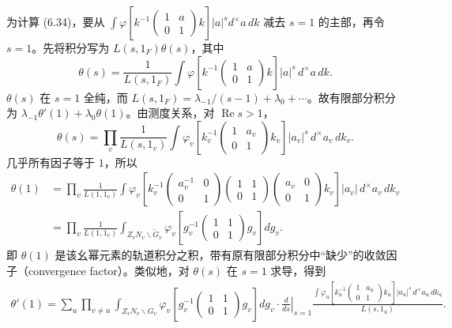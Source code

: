 为计算 (6.34)，要从
$\int\varphi[k^{-1}\left(\begin{smallmatrix}1&a\\0&1\end{smallmatrix}\right)k]|a|^s d^\times a\,dk$
减去 $s=1$ 的主部，再令 $s=1$。先将积分写为 $L(s,1_F)\theta(s)$，其中
\begin{equation}
 \theta(s)=\frac1{L(s,1_F)}\int
 \varphi\!\left[k^{-1}\begin{pmatrix}1&a\\0&1\end{pmatrix}k\right]|a|^s\,d^\times a\,dk.\tag{7.10}
\end{equation}
$\theta(s)$ 在 $s=1$ 全纯，而
$L(s,1_F)=\lambda_{-1}/(s-1)+\lambda_0+\cdots$。故有限部分积分为
$\lambda_{-1}\theta'(1)+\lambda_0\theta(1)$。由测度关系，对 $\operatorname{Re}s>1$，
\[
 \theta(s)=\prod_v\frac1{L(s,1_v)}\int
 \varphi_v\!\left[k_v^{-1}\begin{pmatrix}1&a_v\\0&1\end{pmatrix}k_v\right]
 |a_v|^s\,d^\times a_v\,dk_v.
\]
几乎所有因子等于 $1$，所以
\[
\begin{aligned}
 \theta(1)
 &=\prod_v\frac1{L(1,1_v)}\int
 \varphi_v\!\left[k_v^{-1}\begin{pmatrix}a_v^{-1}&0\\0&1\end{pmatrix}
 \begin{pmatrix}1&1\\0&1\end{pmatrix}\begin{pmatrix}a_v&0\\0&1\end{pmatrix}k_v\right]
 |a_v|\,d^\times a_v\,dk_v\\
 &=\prod_v\frac1{L(1,1_v)}\int_{Z_vN_v\backslash\widetilde G_v}
 \varphi_v\!\left[g_v^{-1}\begin{pmatrix}1&1\\0&1\end{pmatrix}g_v\right]dg_v.
\end{aligned}
\]
即 $\theta(1)$ 是该幺幂元素的轨道积分之积，带有原有限部分积分中“缺少”的收敛因子（convergence factor）。类似地，对 $\theta(s)$ 在 $s=1$ 求导，得到
\begin{equation}
\begin{split}
 \theta'(1)=\sum_u\prod_{v\ne u}
 \int_{Z_vN_v\backslash G_v}\varphi_v\!\left[g_v^{-1}\begin{pmatrix}1&1\\0&1\end{pmatrix}g_v\right]dg_v
 \cdot\left.\frac d{ds}\right|_{s=1}
 \frac{\int\varphi_u[k_u^{-1}\left(\begin{smallmatrix}1&a_u\\0&1\end{smallmatrix}\right)k_u]
 |a_u|^s\,d^\times a_u\,dk_u}{L(s,1_u)}.
\end{split}\tag{7.11}
\end{equation}
